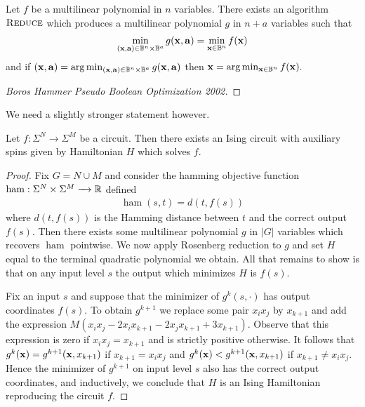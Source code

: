 \documentclass{article}
\begin{document}
\begin{thm}\label{thm:rosenberg-reduction}
  Let $f$ be a multilinear polynomial in $n$ variables. There exists an algorithm $\textsc{Reduce}$ which produces a multilinear polynomial $g$ in $n + a$ variables such that
  \begin{align*}
    \min_{(\bfx, \bfa) \in \bB^n \times \bB^a} g(\bfx, \bfa) = \min_{\bfx \in \bB^n} f(\bfx)
  \end{align*}
  and if $(\bfx, \bfa) = \arg\min_{(\bfx, \bfa) \in \bB^n \times \bB^a} g(\bfx, \bfa)$ then $\bfx = \arg\min_{\bfx \in \bB^n} f(\bfx).$
\end{thm}
\begin{proof}
  [Boros Hammer Pseudo Boolean Optimization 2002]
\end{proof}
We need a slightly stronger statement however.
\begin{thm}
  Let $f:\Sigma^N \to \Sigma^M$ be a circuit. Then there exists an Ising circuit with auxiliary spins given by Hamiltonian $H$ which solves $f$.
\end{thm}
\begin{proof}
  Fix $G = N \cup M$ and consider the hamming objective function $\operatorname{ham}:\Sigma^N\times \Sigma^M\to \bR$ defined
  \begin{align*}
    \operatorname{ham}(s,t) = d(t, f(s))
  \end{align*}
  where $d(t, f(s))$ is the Hamming distance between $t$ and the correct output $f(s)$. Then there exists some multilinear polynomial $g$ in $|G|$ variables which recovers $\operatorname{ham}$ pointwise. We now apply Rosenberg reduction to $g$ and set $H$ equal to the terminal quadratic polynomial we obtain. All that remains to show is that on any input level $s$ the output which minimizes $H$ is $f(s)$.

  Fix an input $s$ and suppose that the minimizer of $g^k(s, \cdot)$ has output coordinates $f(s)$. To obtain $g^{k+1}$ we replace some pair $x_ix_j$ by $x_{k+1}$ and add the expression $M(x_ix_j - 2x_ix_{k+1} - 2x_jx_{k+1} + 3x_{k+1})$. Observe that this expression is zero if $x_ix_j = x_{k+1}$ and is strictly positive otherwise. It follows that $g^k(\mathbf{x}) = g^{k+1}(\mathbf{x}, x_{k+1})$ if $x_{k+1} = x_ix_j$ and $g^k(\mathbf{x}) < g^{k+1}(\mathbf{x}, x_{k+1})$ if $x_{k+1} \neq x_ix_j$. Hence the minimizer of $g^{k+1}$ on input level $s$ also has the correct output coordinates, and inductively, we conclude that $H$ is an Ising Hamiltonian reproducing the circuit $f$.
\end{proof}
\newpage


\end{document}
